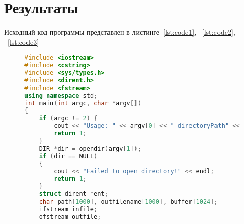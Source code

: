 \documentclass[a4paper, 14pt]{extarticle}
\begin{document}
\section{Результаты}\label{Sect::res}

Исходный код программы представлен в листинге~\ref{lst:code1}, ~\ref{lst:code2}, ~\ref{lst:code3}

\begin{figure}[!htb]
\begin{lstlisting}[language={c++},caption={main.cpp},label={lst:code1}]
#include <iostream>
#include <cstring>
#include <sys/types.h>
#include <dirent.h>
#include <fstream>
using namespace std;
int main(int argc, char *argv[])
{
    if (argc != 2) {
        cout << "Usage: " << argv[0] << " directoryPath" << endl;
        return 1;
    }
    DIR *dir = opendir(argv[1]);
    if (dir == NULL)
    {
        cout << "Failed to open directory!" << endl;
        return 1;
    }
    struct dirent *ent;
    char path[1000], outfilename[1000], buffer[1024];
    ifstream infile;
    ofstream outfile;
\end{lstlisting}
\end{figure}
\end{document}
